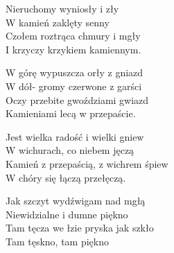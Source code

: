 \begin{text}
    Nieruchomy wyniosły i zły\\
    W kamień zaklęty senny\\
    Czołem roztrąca chmury i mgły\\
    I krzyczy krzykiem kamiennym.

    W górę wypuszcza orły z gniazd\\
    W dół- gromy czerwone z garści\\
    Oczy przebite gwoździami gwiazd\\
    Kamieniami lecą w przepaście.

    Jest wielka radość i wielki gniew\\
    W wichurach, co niebem jęczą\\
    Kamień z przepaścią, z wichrem śpiew\\
    W chóry się łączą przełęczą.

    Jak szczyt wydźwigam nad mgłą\\
    Niewidzialne i dumne piękno\\
    Tam tęcza we łzie pryska jak szkło\\
    Tam tęskno, tam piękno
\end{text}
\begin{chord}

\end{chord}